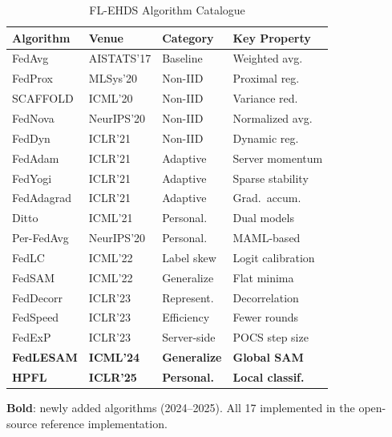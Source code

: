 \documentclass[conference,a4paper]{IEEEtran}
\begin{document}
\begin{table}[htbp]
\centering
\caption{FL-EHDS Algorithm Catalogue}
\label{tab:algo_catalogue_supp}
\small
\begin{tabular}{llll}
\toprule
\textbf{Algorithm} & \textbf{Venue} & \textbf{Category} & \textbf{Key Property} \\
\midrule
FedAvg & AISTATS'17 & Baseline & Weighted avg. \\
FedProx & MLSys'20 & Non-IID & Proximal reg. \\
SCAFFOLD & ICML'20 & Non-IID & Variance red. \\
FedNova & NeurIPS'20 & Non-IID & Normalized avg. \\
FedDyn & ICLR'21 & Non-IID & Dynamic reg. \\
FedAdam & ICLR'21 & Adaptive & Server momentum \\
FedYogi & ICLR'21 & Adaptive & Sparse stability \\
FedAdagrad & ICLR'21 & Adaptive & Grad.\ accum. \\
Ditto & ICML'21 & Personal. & Dual models \\
Per-FedAvg & NeurIPS'20 & Personal. & MAML-based \\
FedLC & ICML'22 & Label skew & Logit calibration \\
FedSAM & ICML'22 & Generalize & Flat minima \\
FedDecorr & ICLR'23 & Represent. & Decorrelation \\
FedSpeed & ICLR'23 & Efficiency & Fewer rounds \\
FedExP & ICLR'23 & Server-side & POCS step size \\
\textbf{FedLESAM} & \textbf{ICML'24} & \textbf{Generalize} & \textbf{Global SAM} \\
\textbf{HPFL} & \textbf{ICLR'25} & \textbf{Personal.} & \textbf{Local classif.} \\
\bottomrule
\end{tabular}

\vspace{1mm}
\footnotesize{\textbf{Bold}: newly added algorithms (2024--2025). All 17 implemented in the open-source reference implementation.}
\end{table}
\end{document}
